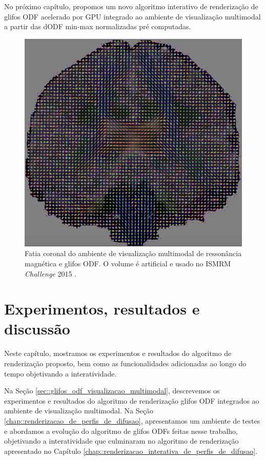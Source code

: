 \documentclass[
    12pt,                %
    oneside,            %
    a4paper,            %
    english,            %
    french,                %
    spanish,            %
    brazil                %
    ]{abntex2}
\begin{document}
No próximo capítulo, propomos um novo algoritmo interativo de renderização de glifos ODF acelerado por GPU integrado ao ambiente de visualização multimodal \cite{voltoline2021} a partir das dODF min-max normalizadas pré computadas.

 \begin{figure}[H]
     \centering
     \includegraphics[width=0.7\linewidth, angle=0]{figs/Exemplos_QBall_visualizacao/Coronal.png}
     \caption{Fatia coronal do ambiente de visualização multimodal de ressonância magnética e glifos ODF. O volume é artificial e usado no ISMRM \textit{Challenge} 2015 \cite{TractometerTool}.}
      \label{fig::QBall_glifos_coronal}
 \end{figure}



%
%



\chapter{Experimentos, resultados e discussão}
\label{sec::experimentos}

Neste capítulo, mostramos os experimentos e resultados do algoritmo de renderização proposto, bem como as funcionalidades adicionadas ao longo do tempo objetivando a interatividade.

Na Seção \ref{sec::glifos_odf_visualizacao_multimodal}, descrevemos os experimentos e resultados do algoritmo de renderização glifos ODF integrados ao ambiente de visualização multimodal. Na Seção \ref{chap::renderizacao_de_perfis_de_difusao}, apresentamos um ambiente de testes e abordamos a evolução do algoritmo de glifos ODFs feitas nesse trabalho, objetivando a interatividade que culminaram no algoritmo de renderização apresentado no Capítulo \ref{chap::renderizacao_interativa_de_perfis_de_difusao}.
\end{document}
